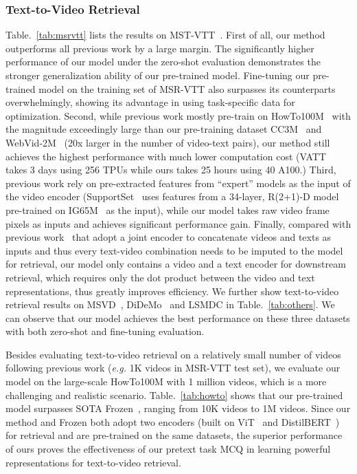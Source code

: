 \documentclass[10pt,twocolumn,letterpaper]{article}
\begin{document}
\subsubsection{Text-to-Video Retrieval}
Table.~\ref{tab:msrvtt} lists the results on MST-VTT~\cite{msr}. First of all, our method outperforms all previous work by a large margin. The significantly higher performance of our model under the zero-shot evaluation demonstrates the stronger generalization ability of our pre-trained model. Fine-tuning our pre-trained model on the training set of MSR-VTT also surpasses its counterparts overwhelmingly, showing its advantage in using task-specific data for optimization. 
Second, while previous work mostly pre-train on HowTo100M~\cite{howto100m} with the magnitude exceedingly large than our pre-training dataset CC3M~\cite{cc3m} and WebVid-2M~\cite{frozen} (20x larger in the number of video-text pairs), our method still achieves the highest performance with much lower computation cost (\ie VATT~\cite{vatt} takes 3 days using 256 TPUs while ours takes 25 hours using 40 A100.)
Third, previous work rely on pre-extracted features from ``expert'' models as the input of the video encoder (\ie SupportSet~\cite{support} uses features from a 34-layer,
R(2+1)-D model~\cite{3d} pre-trained on IG65M~\cite{ig65} as the input), while our model takes raw video frame pixels as inputs and achieves significant performance gain.
Finally, compared with previous work~\cite{clipbert, hero, univl, vlm, actbert} that adopt a joint encoder to concatenate videos and texts as inputs and thus every text-video combination needs to be imputed to the model for retrieval, our model only contains a video and a text encoder for downstream retrieval, which requires only the dot product between the video and text representations, thus greatly improves efficiency. 
We further show text-to-video retrieval results on MSVD~\cite{msvd}, DiDeMo~\cite{didemo} and LSMDC in Table.~\ref{tab:others}. We can observe that our model achieves the best performance on these three datasets with both zero-shot and fine-tuning evaluation.

Besides evaluating text-to-video retrieval on a relatively small number of videos following previous work (\textit{e.g.} 1K videos in MSR-VTT test set), 
we evaluate our model on the large-scale HowTo100M with 1 million videos, which is a more challenging and realistic scenario. Table.~\ref{tab:howto} shows that our pre-trained model surpasses SOTA Frozen~\cite{frozen}, ranging from 10K videos to 1M videos. Since our method and Frozen both adopt two encoders (built on ViT~\cite{vit} and DistilBERT~\cite{distilbert}) for retrieval and are pre-trained on the same datasets, the superior performance of ours proves the effectiveness of our pretext task MCQ in learning powerful representations for text-to-video retrieval.
\end{document}
